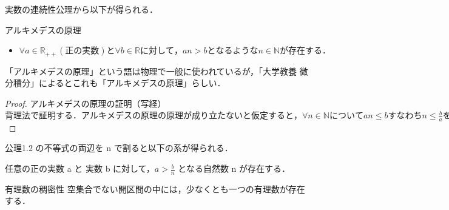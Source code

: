 \documentclass[a4paper]{ltjsarticle}
\begin{document}
実数の連続性公理から以下が得られる．
\begin{corollary}{アルキメデスの原理}{}
\begin{itemize}
\item $ \forall a \in \mathbb{R} _ {++} (正の実数) と \forall b \in \mathbb{R} に対して，an > b となるような n \in \mathbb{N} が存在する．$

\end{itemize}
\end{corollary}
「アルキメデスの原理」という語は物理で一般に使われているが，「大学教養 微分積分」によるとこれも「アルキメデスの原理」らしい．

\begin{proof}{アルキメデスの原理の証明（写経）}{}
\begin{math}
背理法で証明する．アルキメデスの原理の原理が成り立たないと仮定すると，\forall n \in \mathbb{N} について an \leq bすなわち n \leq \frac{b}{a} を満たす a \in \mathbb{R}_{++} と b \in \mathbb{R} が存在する．よって実数の連続性公理から \mathbb{N} は上に有界であり，\sup \mathbb{N} が存在する．また，\sup \mathbb{N} - 1 は \mathbb{N} の上界ではないので，\sup \mathbb{N} - 1 < m となる自然数 m が存在する．このとき，\sup \mathbb{N} < m + 1 であるから，\sup \mathbb{N} より大きい自然数 m + 1 が存在する．このことは，\forall n \in \mathbb{N} について n \leq \sup \mathbb{N} であることに矛盾する．
\end{math}
\end{proof}


公理1.2 の不等式の両辺を n で割ると以下の系が得られる．

\begin{corollary}{}{}
任意の正の実数 a と 実数 b に対して，$a > \frac{b}{n}$ となる自然数 n が存在する．
\end{corollary}

\begin{theorem}{有理数の稠密性}{}
空集合でない開区間の中には，少なくとも一つの有理数が存在する．
\end{theorem}
\end{document}
